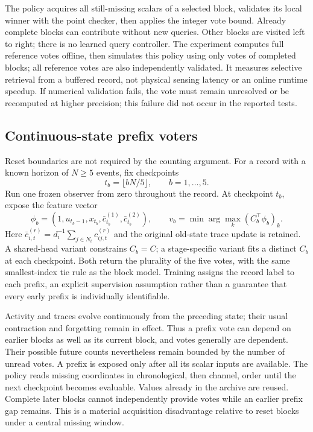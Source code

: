 \documentclass[11pt,a4paper]{article}
\theoremstyle{definition}\newtheorem{definition}[theorem]{Definition}
\begin{document}
The policy acquires all still-missing scalars of a selected block, validates its local winner with the point checker, then applies the integer vote bound. Already complete blocks can contribute without new queries. Other blocks are visited left to right; there is no learned query controller. The experiment computes full reference votes offline, then simulates this policy using only votes of completed blocks; all reference votes are also independently validated. It measures selective retrieval from a buffered record, not physical sensing latency or an online runtime speedup. If numerical validation fails, the vote must remain unresolved or be recomputed at higher precision; this failure did not occur in the reported tests.

\subsection{Continuous-state prefix voters}\label{sec:prefix}
Reset boundaries are not required by the counting argument. For a record with a known horizon of $N\ge5$ events, fix checkpoints
\begin{equation}
 t_b=\lfloor bN/5\rfloor,\qquad b=1,\ldots,5.
 \label{eq:prefixcuts}
\end{equation}
Run one frozen observer from zero throughout the record. At checkpoint $t_b$, expose the feature vector
\begin{equation}
 \phi_b=(1,u_{t_b-1},x_{t_b},\bar c^{(1)}_{t_b},\bar c^{(2)}_{t_b}),
 \qquad v_b=\min\arg\max_k (C_b^\top\phi_b)_k .
 \label{eq:prefixvote}
\end{equation}
Here $\bar c^{(r)}_{i,t}=d_i^{-1}\sum_{j\in N_i}c^{(r)}_{ij,t}$ and the original old-state trace update is retained. A shared-head variant constrains $C_b=C$; a stage-specific variant fits a distinct $C_b$ at each checkpoint. Both return the plurality of the five votes, with the same smallest-index tie rule as the block model. Training assigns the record label to each prefix, an explicit supervision assumption rather than a guarantee that every early prefix is individually identifiable.

Activity and traces evolve continuously from the preceding state; their usual contraction and forgetting remain in effect. Thus a prefix vote can depend on earlier blocks as well as its current block, and votes generally are dependent. Their possible future counts nevertheless remain bounded by the number of unread votes. A prefix is exposed only after all its scalar inputs are available. The policy reads missing coordinates in chronological, then channel, order until the next checkpoint becomes evaluable. Values already in the archive are reused. Complete later blocks cannot independently provide votes while an earlier prefix gap remains. This is a material acquisition disadvantage relative to reset blocks under a central missing window.
\end{document}
